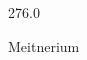 \documentclass[12pt]{article}
\begin{document}
\hfill{}
\vfill
\begin{center}
  {\fontsize{50}{60}
  }

  276.0

Meitnerium
\end{center}
\vfill
\end{document}
